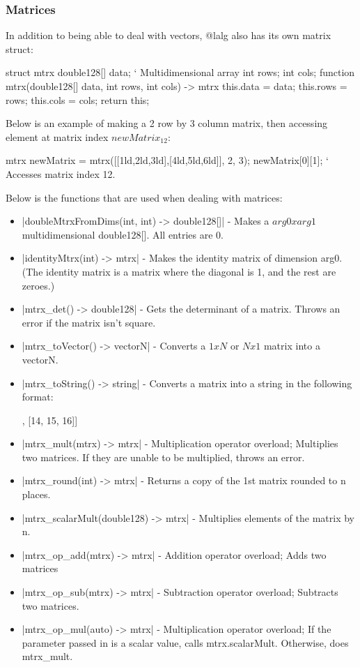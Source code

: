\documentclass[12pt, letterpaper, oneside]{article}
\begin{document}
	\subsubsection{Matrices}
	In addition to being able to deal with vectors, @lalg also has its own matrix struct:
	
	
	\begin{spverbatim}
		struct mtrx {
			double128[] data; ` Multidimensional array
			int rows;
			int cols;
			function mtrx(double128[] data, int rows, int cols) -> mtrx {
				this.data = data;
				this.rows = rows;
				this.cols = cols;
				return this;
			}
		}
	\end{spverbatim}
	Below is an example of making a 2 row by 3 column matrix, then accessing element at matrix index $newMatrix_{12}$:
	\begin{spverbatim}
		mtrx newMatrix = mtrx([[1ld,2ld,3ld],[4ld,5ld,6ld]], 2, 3);
		newMatrix[0][1]; ` Accesses matrix index 12.
	\end{spverbatim}
	Below is the functions that are used when dealing with matrices:
	\begin{itemize}
		\item[--] \spverb|doubleMtrxFromDims(int, int) -> double128[]| - Makes a $arg0 x arg1$ multidimensional double128[]. All entries are 0.
		\item[--] \spverb|identityMtrx(int) -> mtrx| - Makes the identity matrix of dimension arg0. (The identity matrix is a matrix where the diagonal is 1, and the rest are zeroes.)
		\item[--] \spverb|mtrx_det() -> double128| - Gets the determinant of a matrix. Throws an error if the matrix isn't square.
		\item[--] \spverb|mtrx_toVector() -> vectorN| - Converts a $1 x N$ or $N x 1$ matrix into a vectorN.
		\item[--] \spverb|mtrx_toString() -> string| - Converts a matrix into a string in the following format:
		\begin{spverbatim}
			[[11, 12, 13],
			 [14, 15, 16]]
		\end{spverbatim}
		\item[--] \spverb|mtrx_mult(mtrx) -> mtrx| - Multiplication operator overload; Multiplies two matrices. If they are unable to be multiplied, throws an error.
		\item[--] \spverb|mtrx_round(int) -> mtrx| - Returns a copy of the 1st matrix rounded to n places.
		\item[--] \spverb|mtrx_scalarMult(double128) -> mtrx| - Multiplies elements of the matrix by n.
		\item[--] \spverb|mtrx_op_add(mtrx) -> mtrx| - Addition operator overload; Adds two matrices
		\item[--] \spverb|mtrx_op_sub(mtrx) -> mtrx| - Subtraction operator overload; Subtracts two matrices.
		\item[--] \spverb|mtrx_op_mul(auto) -> mtrx| - Multiplication operator overload; If the parameter passed in is a scalar value, calls mtrx.scalarMult. Otherwise, does mtrx\_mult.
	\end{itemize}
\end{document}

